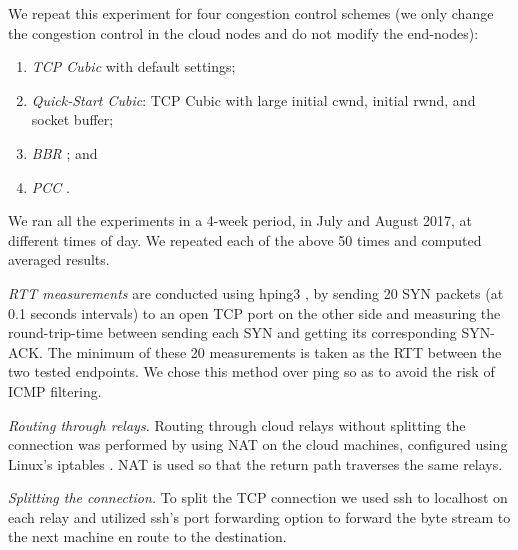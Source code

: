 \documentclass[10pt,sigconf]{acmart}
\newcommand{\mycomm}[3]{{\color{#2} \textbf{[#1: #3]}}}
\newcommand{\mycomm}[3]{}
\newcommand{\IK}[1]{\mycomm{IK}{blue}{#1}}
\newcommand{\AB}[1]{\mycomm{AB}{orange}{#1}}
\def\compactify{\itemsep=0pt \topsep=0pt \partopsep=0pt \parsep=0pt}
\let\latexusecounter=\usecounter
\newenvironment{CompactEnumerate}
    {\def\usecounter{\compactify\latexusecounter}
     \begin{enumerate}}
    {\end{enumerate}\let\usecounter=\latexusecounter}
\newcommand{\PST}[1]{\smallskip\noindent\textit{#1}} %
\begin{document}
We repeat this experiment for four congestion control schemes (we only change the congestion control in the cloud nodes and do not modify the end-nodes):
\begin{CompactEnumerate}
      \item \textit{TCP Cubic} with default settings;
      \item \textit{Quick-Start Cubic}: TCP Cubic with large initial cwnd, initial rwnd, and socket buffer;
      \item \textit{BBR} \cite{BBR}; and
      \item \textit{PCC} \cite{PCC}.
\end{CompactEnumerate} 
We ran all the experiments in a 4-week period, in July and August 2017, at different times of day. We repeated each of the above 50 times and computed averaged results.

\ifblind \else
\smallskip{} \textit{RTT measurements} are conducted using hping3 \cite{hping3}, by sending 20 SYN packets (at 0.1 seconds intervals) to an open TCP port on the other side and measuring the round-trip-time between sending each SYN and getting its corresponding SYN-ACK. The minimum of these 20 measurements is taken as the RTT between the two tested endpoints. We chose this method over ping so as to avoid the risk of ICMP filtering.

\PST{Routing through relays.} Routing through cloud relays without splitting the connection was performed by using NAT on the cloud machines, configured using Linux's iptables \cite{iptables}. NAT is used so that the return path traverses the same relays.

\PST{Splitting the connection.} To split the TCP connection we used ssh to localhost on each relay and utilized ssh's port forwarding option to forward the byte stream to the next machine en route to the destination.
\fi



\end{document}
